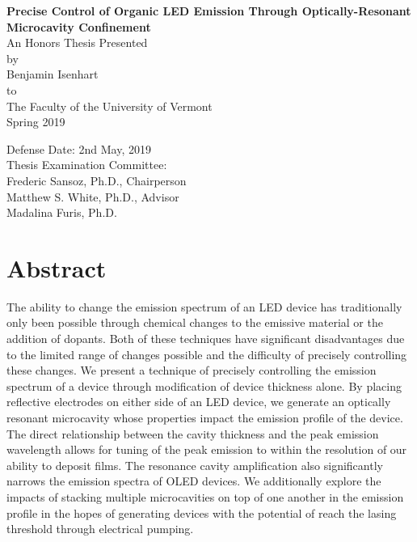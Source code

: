 \documentclass{report}
\author{Benjamin Isenhart}
\begin{document}
\begin{titlepage}
	\begin{center}
		\vspace{1cm}
		\Huge
		\textbf{Precise Control of Organic LED Emission Through Optically-Resonant Microcavity Confinement}\\
		\vspace{1.5cm}
		\Large
		An Honors Thesis Presented\\
		by\\
		Benjamin Isenhart\\
		to\\
		The Faculty of the University of Vermont\\
		\vspace{0.5cm}
		Spring 2019
		\vspace{2cm}
	\end{center}
	\begin{flushright}
		\Large
		Defense Date: 2nd May, 2019\\
		Thesis Examination Committee:\\
		\vspace{0.5cm}
		Frederic Sansoz, Ph.D., Chairperson\\
		Matthew S. White, Ph.D., Advisor\\
		Madalina Furis, Ph.D.\\
	\end{flushright}
\end{titlepage}

\chapter*{Abstract} \label{abstract}
The ability to change the emission spectrum of an LED device has traditionally only been possible through chemical changes to the emissive material or the addition of dopants. Both of these techniques have significant disadvantages due to the limited range of changes possible and the difficulty of precisely controlling these changes. We present a technique of precisely controlling the emission spectrum of a device through modification of device thickness alone. By placing reflective electrodes on either side of an LED device, we generate an optically resonant microcavity whose properties impact the emission profile of the device. The direct relationship between the cavity thickness and the peak emission wavelength allows for tuning of the peak emission to within the resolution of our ability to deposit films. The resonance cavity amplification also significantly narrows the emission spectra of OLED devices. We additionally explore the impacts of stacking multiple microcavities on top of one another in the emission profile in the hopes of generating devices with the potential of reach the lasing threshold through electrical pumping.
\end{document}
